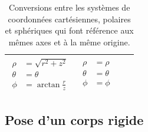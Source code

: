 \begin{table}[htbp]
\begin{tabular}{|p{3cm}|p{3cm}|p{3cm}|p{3cm}|}
{\begin{align*}
				  \rho &= \sqrt{r^2+z^2} \\
				  \theta &= \theta \\
				  \phi &= \arctan \frac{r}{z}
		\end{align*}}
		&
		\vbox{\begin{align*}
				  \rho &= \rho \\
				  \theta &= \theta \\
				  \phi &= \phi
		\end{align*}}
		\\
		\hline
	\end{tabular}
	\caption{Conversions entre les systèmes de coordonnées cartésiennes, polaires et sphériques qui font référence aux mêmes axes et à la même origine.}
	\label{tab:convcoord}
\end{table}

\subsection{Pose d'un corps rigide}
\label{sec:syscoordpose}

